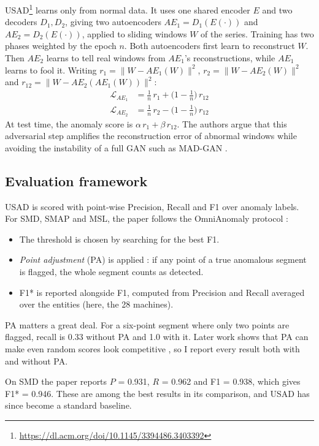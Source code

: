 \documentclass[11pt]{article}
\begin{document}
USAD\footnote{\url{https://dl.acm.org/doi/10.1145/3394486.3403392}} \citep{audibert2020usad} learns only from normal data. It uses one shared encoder $E$ and two decoders $D_1, D_2$, giving two autoencoders $AE_1 = D_1(E(\cdot))$ and $AE_2 = D_2(E(\cdot))$, applied to sliding windows $W$ of the series. Training has two phases weighted by the epoch $n$. Both autoencoders first learn to reconstruct $W$. Then $AE_2$ learns to tell real windows from $AE_1$'s reconstructions, while $AE_1$ learns to fool it. Writing $r_1 = \lVert W-AE_1(W)\rVert^2$, $r_2 = \lVert W-AE_2(W)\rVert^2$ and $r_{12} = \lVert W-AE_2(AE_1(W))\rVert^2$:
\begin{align*}
\mathcal{L}_{AE_1} &= \tfrac{1}{n}\,r_1 + \bigl(1-\tfrac{1}{n}\bigr)\,r_{12}\\
\mathcal{L}_{AE_2} &= \tfrac{1}{n}\,r_2 - \bigl(1-\tfrac{1}{n}\bigr)\,r_{12}
\end{align*}
At test time, the anomaly score is $\alpha\,r_1 + \beta\,r_{12}$. The authors argue that this adversarial step amplifies the reconstruction error of abnormal windows while avoiding the instability of a full GAN such as MAD-GAN \citep{li2019madgan}.

\subsection{Evaluation framework}
USAD is scored with point-wise Precision, Recall and F1 over anomaly labels. For SMD, SMAP and MSL, the paper follows the OmniAnomaly protocol \citep{su2019omnianomaly}:
\begin{itemize}
\item The threshold is chosen by searching for the best F1.
\item \emph{Point adjustment} (PA) is applied \citep{xu2018donut}: if any point of a true anomalous segment is flagged, the whole segment counts as detected.
\item F1* is reported alongside F1, computed from Precision and Recall averaged over the entities (here, the 28 machines).
\end{itemize}
PA matters a great deal. For a six-point segment where only two points are flagged, recall is 0.33 without PA and 1.0 with it. Later work shows that PA can make even random scores look competitive \citep{kim2022rigorous}, so I report every result both with and without PA.

On SMD the paper reports $P$ = 0.931, $R$ = 0.962 and F1 = 0.938, which gives F1* = 0.946. These are among the best results in its comparison, and USAD has since become a standard baseline.
\end{document}
